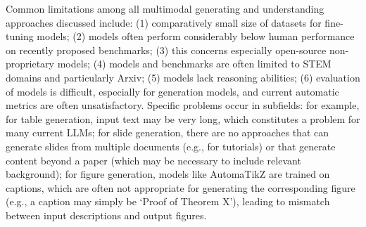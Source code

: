 Common limitations among all multimodal generating and understanding approaches discussed include: (1) comparatively small size of datasets for fine-tuning models; (2) models often perform considerably below human performance on recently proposed benchmarks; (3) this concerns especially open-source non-proprietary models; (4) models and benchmarks are often limited to STEM domains and particularly Arxiv; (5) models lack reasoning abilities; (6) evaluation of models is difficult, especially for generation models, and current automatic metrics are often unsatisfactory. Specific problems occur in subfields: for example, for table generation, input text may be very long, which constitutes a problem for many current LLMs; for slide generation, there are no approaches that can generate slides from multiple documents (e.g., for tutorials) or that generate content beyond a paper (which may be necessary to include relevant background); for figure generation, models like AutomaTikZ are trained on captions, which are often not appropriate for generating the corresponding figure (e.g., a caption may simply be `Proof of Theorem X'), leading to mismatch between input descriptions and output figures. 






